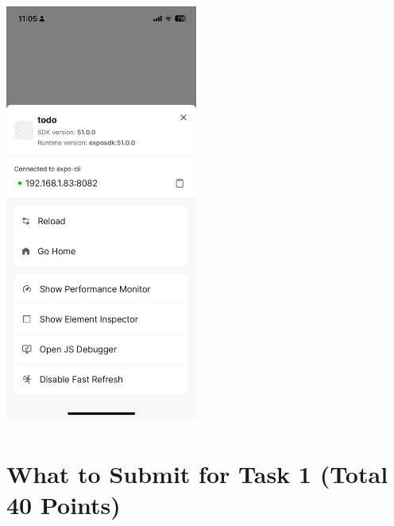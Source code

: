 \documentclass{article}
\begin{document}
\includegraphics[width=2.49141in,height=5.53646in]{media/image21.jpg}


\section*{What to Submit for Task 1 (Total 40 Points)}
\end{document}
